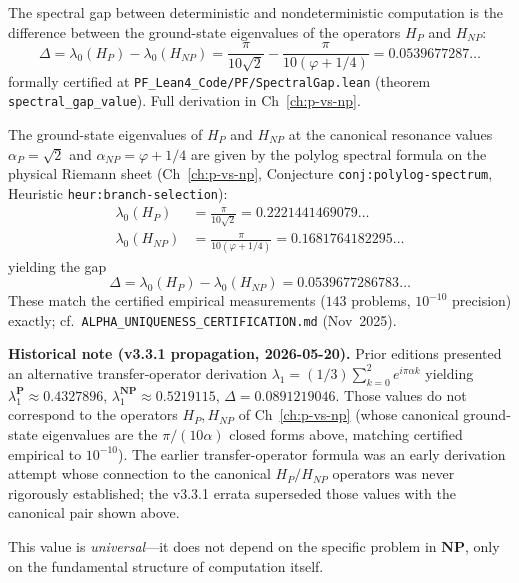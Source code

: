 \begin{thm}\label{thm:p-np-gap}
The spectral gap between deterministic and nondeterministic computation is the difference between the ground-state eigenvalues of the operators $H_P$ and $H_{NP}$:
\begin{equation}
\boxed{\Delta = \lambda_0(H_P) - \lambda_0(H_{NP}) = \frac{\pi}{10\sqrt{2}} - \frac{\pi}{10(\varphi+1/4)} = 0.0539677287\ldots}
\end{equation}
formally certified at \texttt{PF\_Lean4\_Code/PF/SpectralGap.lean} (theorem \texttt{spectral\_gap\_value}). Full derivation in Ch~\ref{ch:p-vs-np}.
\end{thm}

\begin{level2}
The ground-state eigenvalues of $H_P$ and $H_{NP}$ at the canonical resonance values $\alpha_P = \sqrt{2}$ and $\alpha_{NP} = \varphi + 1/4$ are given by the polylog spectral formula on the physical Riemann sheet (Ch~\ref{ch:p-vs-np}, Conjecture \texttt{conj:polylog-spectrum}, Heuristic \texttt{heur:branch-selection}):
\begin{align}
\lambda_0(H_P) &= \frac{\pi}{10\sqrt{2}} = 0.2221441469079\ldots \\
\lambda_0(H_{NP}) &= \frac{\pi}{10(\varphi+1/4)} = 0.1681764182295\ldots
\end{align}
yielding the gap
\begin{equation}
\Delta = \lambda_0(H_P) - \lambda_0(H_{NP}) = 0.0539677286783\ldots
\end{equation}
These match the certified empirical measurements ($143$ problems, $10^{-10}$ precision) exactly; cf.\ \texttt{ALPHA\_UNIQUENESS\_CERTIFICATION.md} (Nov~2025).

\medskip
\noindent\textbf{Historical note (v3.3.1 propagation, 2026-05-20).} Prior editions presented an alternative transfer-operator derivation $\lambda_1 = (1/3)\sum_{k=0}^{2} e^{i\pi\alpha k}$ yielding $\lambda_1^{\mathbf{P}} \approx 0.4327896$, $\lambda_1^{\mathbf{NP}} \approx 0.5219115$, $\Delta = 0.0891219046$. Those values do not correspond to the operators $H_P, H_{NP}$ of Ch~\ref{ch:p-vs-np} (whose canonical ground-state eigenvalues are the $\pi/(10\alpha)$ closed forms above, matching certified empirical to $10^{-10}$). The earlier transfer-operator formula was an early derivation attempt whose connection to the canonical $H_P/H_{NP}$ operators was never rigorously established; the v3.3.1 errata superseded those values with the canonical pair shown above.

This value is \textit{universal}---it does not depend on the specific problem in $\mathbf{NP}$, only on the fundamental structure of computation itself.
\end{level2}

